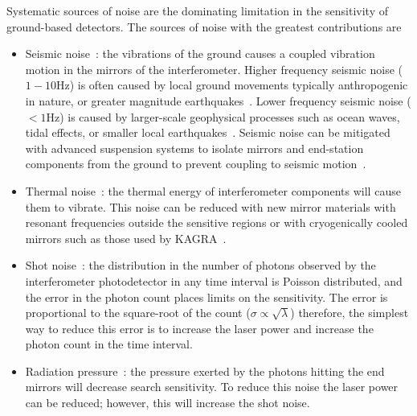 
Systematic sources of noise are the dominating limitation in the sensitivity of ground-based detectors. The sources of noise with the greatest contributions are
%
\begin{itemize}
    \item Seismic noise~\cite{Glanzer:2023}: the vibrations of the ground causes a coupled vibration motion in the mirrors of the interferometer. Higher frequency seismic noise ($1-10$Hz) is often caused by local ground movements typically anthropogenic in nature, or greater magnitude earthquakes~\cite{Nuttall:2018}. Lower frequency seismic noise ($<1$Hz) is caused by larger-scale geophysical processes such as ocean waves, tidal effects, or smaller local earthquakes~\cite{aLIGO:2015}. Seismic noise can be mitigated with advanced suspension systems to isolate mirrors and end-station components from the ground to prevent coupling to seismic motion~\cite{seismic_isolation:2015}.
    \item Thermal noise~\cite{thermal_noise:2018}: the thermal energy of interferometer components will cause them to vibrate. This noise can be reduced with new mirror materials with resonant frequencies outside the sensitive regions or with cryogenically cooled mirrors such as those used by KAGRA~\cite{KAGRA:2021}.
    \item Shot noise~\cite{quantum_noise:2003}: the distribution in the number of photons observed by the interferometer photodetector in any time interval is Poisson distributed, and the error in the photon count places limits on the sensitivity. The error is proportional to the square-root of the count ($\sigma \propto \sqrt{\lambda}$) therefore, the simplest way to reduce this error is to increase the laser power and increase the photon count in the time interval.
    \item Radiation pressure~\cite{quantum_noise:2003}: the pressure exerted by the photons hitting the end mirrors will decrease search sensitivity. To reduce this noise the laser power can be reduced; however, this will increase the shot noise.
\end{itemize}

